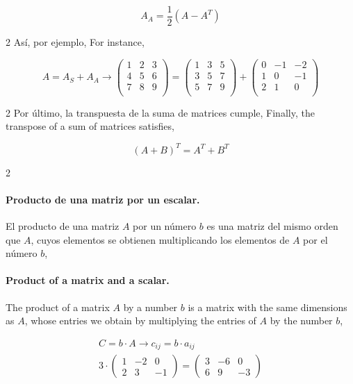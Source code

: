 \begin{equation*}
A_A=\frac{1}{2}\left( A-A^T \right)
\end{equation*}
\begin{paracol}{2}
Así, por ejemplo,
\switchcolumn
For instance,
\end{paracol}
\begin{equation*}
 A=A_S+A_A \rightarrow
\begin{pmatrix}
1& 2& 3\\
4& 5& 6\\
7& 8& 9\\
\end{pmatrix} =
\begin{pmatrix}
1& 3& 5\\
3& 5& 7\\
5& 7& 9\\
\end{pmatrix} +
\begin{pmatrix}
0& -1& -2\\
1& 0& -1\\
2& 1& 0\\
\end{pmatrix}
\end{equation*}
\begin{paracol}{2}
Por último, la transpuesta de la suma de matrices cumple,
\switchcolumn
Finally, the transpose of a sum of matrices satisfies,
\end{paracol}

\begin{equation*}
(A+B)^T=A^T+B^T
\end{equation*}

\begin{paracol}{2}
\paragraph{Producto de una matriz por un escalar.} El producto de una matriz $A$ por un número $b$ es una matriz del mismo orden que $A$, cuyos elementos se obtienen multiplicando los elementos de $A$ por el número $b$,
\switchcolumn
\paragraph{Product of a matrix and a scalar.} The product of a matrix $A$ by a number $b$ is a matrix with the same dimensions as $A$, whose entries we obtain by multiplying the entries of $A$ by the number $b$,
\end{paracol}
\begin{gather*}
C=b\cdot A \rightarrow c_{ij}=b\cdot a_{ij}\\
3\cdot
\begin{pmatrix}
1& -2& 0\\
2& 3& -1
\end{pmatrix}=
\begin{pmatrix}
3& -6& 0\\
6& 9& -3
\end{pmatrix} 
\end{gather*}

